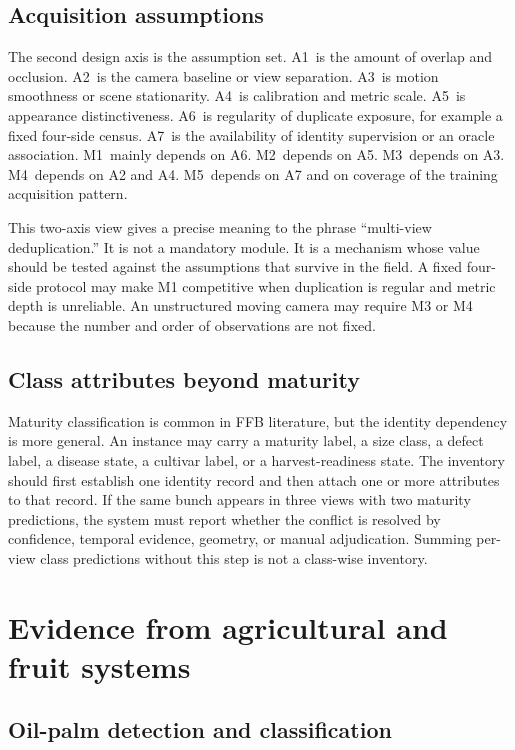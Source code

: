 \subsection{Acquisition assumptions}

The second design axis is the assumption set. A1~is the amount of overlap and occlusion. A2~is the camera baseline or view separation. A3~is motion smoothness or scene stationarity. A4~is calibration and metric scale. A5~is appearance distinctiveness. A6~is regularity of duplicate exposure, for example a fixed four-side census. A7~is the availability of identity supervision or an oracle association. M1~mainly depends on A6. M2~depends on A5. M3~depends on A3. M4~depends on A2 and A4. M5~depends on A7 and on coverage of the training acquisition pattern.

This two-axis view gives a precise meaning to the phrase ``multi-view deduplication.'' It is not a mandatory module. It is a mechanism whose value should be tested against the assumptions that survive in the field. A fixed four-side protocol may make M1 competitive when duplication is regular and metric depth is unreliable. An unstructured moving camera may require M3 or M4 because the number and order of observations are not fixed.

\subsection{Class attributes beyond maturity}

Maturity classification is common in FFB literature, but the identity dependency is more general. An instance may carry a maturity label, a size class, a defect label, a disease state, a cultivar label, or a harvest-readiness state. The inventory should first establish one identity record and then attach one or more attributes to that record. If the same bunch appears in three views with two maturity predictions, the system must report whether the conflict is resolved by confidence, temporal evidence, geometry, or manual adjudication. Summing per-view class predictions without this step is not a class-wise inventory.


\section{Evidence from agricultural and fruit systems}
\label{sec:direct}

\subsection{Oil-palm detection and classification}

